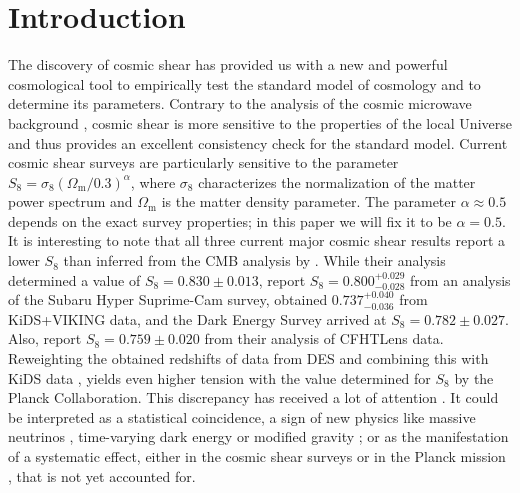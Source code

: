 \documentclass{aa}
\renewcommand{\rm}{\mathrm}
\begin{document}

   \maketitle

%
\section{Introduction}
The discovery of cosmic shear has provided us with a new and powerful cosmological tool to empirically test the standard model of cosmology and to determine its parameters. Contrary to the analysis of the cosmic microwave background \citep[CMB, e.g.~by][]{2018arXiv180706209P}, cosmic shear is more sensitive to the properties of the local Universe and thus provides an excellent consistency check for the standard model. Current cosmic shear surveys are particularly sensitive to the parameter $S_8=\sigma_8 (\Omega_{\rm m}/0.3)^\alpha$, where $\sigma_8$ characterizes the normalization of the matter power spectrum and $\Omega_{\rm m}$ is the matter density parameter. The parameter $\alpha\approx 0.5$ depends on the exact survey properties; in this paper we will fix it to be $\alpha = 0.5$.
It is interesting to note that all three current major cosmic shear results report a lower $S_8$ than inferred from the CMB analysis by \citet{2018arXiv180706209P}. While their analysis determined a value of $S_8 = 0.830 \pm 0.013$, \citet{2018arXiv180909148H} report $S_8 = 0.800^{+0.029}_{-0.028}$ from an analysis of the Subaru Hyper Suprime-Cam survey, \citet[][hereafter H18]{2018arXiv181206076H} obtained $0.737_{-0.036}^{+0.040}$ from KiDS+VIKING data, and the Dark Energy Survey \citep[DES,][]{2018PhRvD..98d3528T} arrived at $S_8=0.782\pm 0.027$. Also, \citet{2013MNRAS.432.2433H} report $S_8 = 0.759 \pm 0.020$ from their analysis of CFHTLens data. Reweighting the obtained redshifts of data from DES and combining this with KiDS data \citep[][Asgari et al.~in prep.]{Joudaki:2019}, yields even higher tension with the value determined for $S_8$ by the Planck Collaboration. This discrepancy has received a lot of attention \citep{2017MNRAS.471.1259J,2019arXiv190103686S,2019arXiv190911006T}. It could be interpreted as a statistical coincidence, a sign of new physics like massive neutrinos \citep{2014PhRvL.112e1303B}, time-varying dark energy or modified gravity \citep{2016A&A...594A..14P}; or as the manifestation of a systematic effect, either in the cosmic shear surveys or in the Planck mission \citep{2016ApJ...818..132A}, that is not yet accounted for. 
\end{document}

